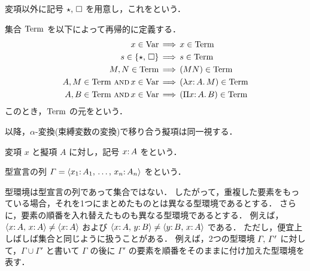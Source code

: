 \documentclass[./main]{subfiles}
\begin{document}
\begin{ziphildefi}
変項以外に記号 $ \mathord{\star},\, \mathord{\square} $ を用意し，これをという．
\end{ziphildefi}

\begin{ziphildefi}
集合 $ \mathop{\mathrm{Term}}\nolimits $ を以下によって再帰的に定義する．
\begin{align*}
x \in \mathop{\mathrm{Var}}\nolimits & \,\Longrightarrow\, x \in \mathop{\mathrm{Term}}\nolimits \\
s \in \{ \mathord{\star},\, \mathord{\square} \} & \,\Longrightarrow\, s \in \mathop{\mathrm{Term}}\nolimits \\
M, N \in \mathop{\mathrm{Term}}\nolimits & \,\Longrightarrow\, (MN) \in \mathop{\mathrm{Term}}\nolimits \\
A, M \in \mathop{\mathrm{Term}}\nolimits \,\mathbin{\text{\textsc{and}}}\, x \in \mathop{\mathrm{Var}}\nolimits & \,\Longrightarrow\, (\lambda x \mathord{:}\, A.\, M) \in \mathop{\mathrm{Term}}\nolimits \\
A, B \in \mathop{\mathrm{Term}}\nolimits \,\mathbin{\text{\textsc{and}}}\, x \in \mathop{\mathrm{Var}}\nolimits & \,\Longrightarrow\, (\Pi x \mathord{:}\, A.\, B) \in \mathop{\mathrm{Term}}\nolimits
\end{align*}
このとき，$ \mathop{\mathrm{Term}}\nolimits $ の元をという．
\end{ziphildefi}

以降，$ \alpha $-変換(束縛変数の変換)で移り合う擬項は同一視する．

\begin{ziphildefi}
変項 $ x $ と擬項 $ A $ に対し，記号 $ x \mathord{:}\, A $ をという．
\end{ziphildefi}

\begin{ziphildefi}
型宣言の列 $ \varGamma = \langle x _1 \mathord{:}\, A _1,\, \dotsc,\, x _n \mathord{:}\, A _n \rangle $ をという．
\end{ziphildefi}

型環境は型宣言の列であって集合ではない．
したがって，重複した要素をもっている場合，それを1つにまとめたものとは異なる型環境であるとする．
さらに，要素の順番を入れ替えたものも異なる型環境であるとする．
例えば，$ \langle x \mathord{:}\, A,\, x \mathord{:}\, A \rangle \ne \langle x \mathord{:}\, A \rangle $ および $ \langle x \mathord{:}\, A,\, y \mathord{:}\, B \rangle \ne \langle y \mathord{:}\, B,\, x \mathord{:}\, A \rangle $ である．
ただし，便宜上しばしば集合と同じように扱うことがある．
例えば，2つの型環境 $ \varGamma,\, \varGamma' $ に対して，$ \varGamma \cup \varGamma' $ と書いて $ \varGamma $ の後に $ \varGamma' $ の要素を順番をそのままに付け加えた型環境を表す．
\end{document}
